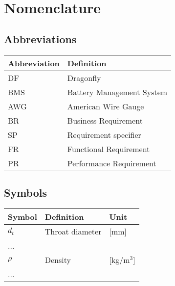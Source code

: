\chapter*{Nomenclature}

\section*{Abbreviations}

\begin{longtable}{p{2.5cm}p{8cm}}
    \toprule
    Abbreviation & Definition \\
    \midrule\endhead %
    DF  & Dragonfly \\
    BMS & Battery Management System\\
    AWG & American Wire Gauge\\
    BR & Business Requirement \\
    SP & Requirement specifier \\
    FR & Functional Requirement \\ 
    PR & Performance Requirement \\
    \bottomrule
\end{longtable}

\section*{Symbols}

\begin{longtable}{p{2.5cm}p{8cm}p{2.5cm}}
    \toprule
    Symbol & Definition & Unit \\
    \midrule\endhead %
    $d_t$ & Throat diameter & [mm] \\
        ... \\
    \midrule %
    $\rho$ & Density & [kg/m$^3$] \\
    ... \\
    \bottomrule
\end{longtable}
